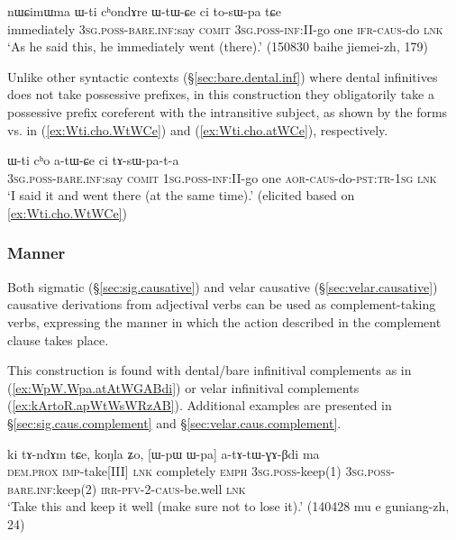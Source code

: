 \begin{exe} 
\ex \label{ex:Wti.cho.WtWCe}  
\gll  nɯɕimɯma ɯ-ti cʰondɤre ɯ-tɯ-ɕe ci to-sɯ-pa tɕe \\
immediately \textsc{3sg}.\textsc{poss}-\textsc{bare}.\textsc{inf}:say \textsc{comit} \textsc{3sg}.\textsc{poss}-\textsc{inf}:\textsc{II}-go  one \textsc{ifr}-\textsc{caus}-do \textsc{lnk} \\
\glt `As he said this, he immediately went (there).' (150830 baihe jiemei-zh, 179)
\end{exe} 

Unlike other syntactic contexts (§\ref{sec:bare.dental.inf}) where dental infinitives does not take possessive prefixes, in this construction they obligatorily take a possessive prefix coreferent with the intransitive subject, as shown by the forms  vs.  in (\ref{ex:Wti.cho.WtWCe}) and (\ref{ex:Wti.cho.atWCe}), respectively.

\begin{exe} 
\ex \label{ex:Wti.cho.atWCe}
\gll   ɯ-ti cʰo a-tɯ-ɕe ci tɤ-sɯ-pa-t-a  \\
\textsc{3sg}.\textsc{poss}-\textsc{bare}.\textsc{inf}:say \textsc{comit} \textsc{1sg}.\textsc{poss}-\textsc{inf}:\textsc{II}-go  one  \textsc{aor}-\textsc{caus}-do-\textsc{pst}:\textsc{tr}-\textsc{1sg} \textsc{lnk} \\
\glt `I said it and went there (at the same time).' (elicited based on \ref{ex:Wti.cho.WtWCe})
\end{exe} 

\subsubsection{Manner} \label{sec:causative.manner.complement}
Both sigmatic (§\ref{sec:sig.causative}) and velar causative (§\ref{sec:velar.causative}) causative derivations from adjectival verbs can be used as complement-taking verbs, expressing the manner in which the action described in the complement clause takes place.


This construction is found with dental/bare infinitival complements as in (\ref{ex:WpW.Wpa.atAtWGABdi}) or velar infinitival complements (\ref{ex:kArtoR.apWtWsWRzAB}). Additional examples are presented in §\ref{sec:sig.caus.complement} and §\ref{sec:velar.caus.complement}. 

\begin{exe} 
\ex \label{ex:WpW.Wpa.atAtWGABdi}
\gll ki tɤ-ndɤm tɕe, koŋla ʑo, [ɯ-pɯ ɯ-pa] a-tɤ-tɯ-ɣɤ-βdi ma  \\
\textsc{dem}.\textsc{prox} \textsc{imp}-take[III] \textsc{lnk} completely \textsc{emph} \textsc{3sg}.\textsc{poss}-keep(1) \textsc{3sg}.\textsc{poss}-\textsc{bare}.\textsc{inf}:keep(2) \textsc{irr}-\textsc{pfv}-2-\textsc{caus}-be.well \textsc{lnk} \\
\glt `Take this and keep it well (make sure not to lose it).' (140428 mu e  guniang-zh, 24)
\end{exe} 

